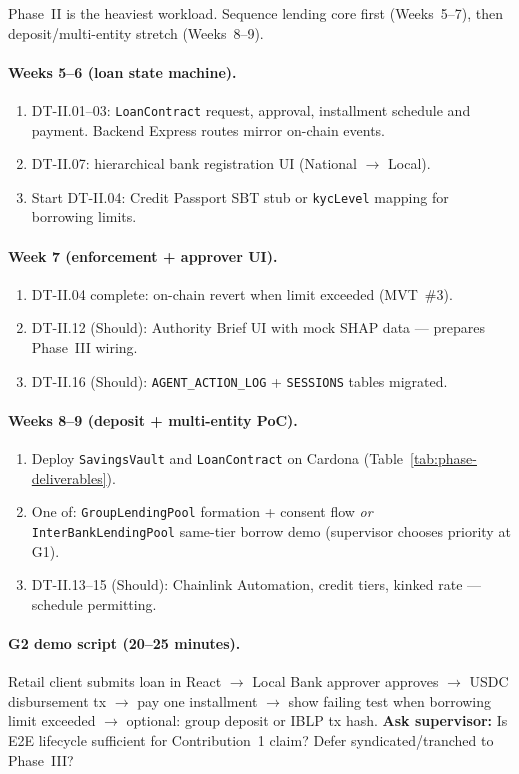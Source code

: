 \documentclass[12pt,a4paper]{report}
\begin{document}
Phase~II is the heaviest workload. Sequence lending core first (Weeks~5--7), then deposit/multi-entity stretch (Weeks~8--9).

\paragraph{Weeks 5--6 (loan state machine).}
\begin{enumerate}[noitemsep]
\item DT-II.01--03: \texttt{LoanContract} request, approval, installment schedule and payment. Backend Express routes mirror on-chain events.
\item DT-II.07: hierarchical bank registration UI (National $\to$ Local).
\item Start DT-II.04: Credit Passport SBT stub or \texttt{kycLevel} mapping for borrowing limits.
\end{enumerate}

\paragraph{Week 7 (enforcement + approver UI).}
\begin{enumerate}[noitemsep]
\item DT-II.04 complete: on-chain revert when limit exceeded (MVT~\#3).
\item DT-II.12 (Should): Authority Brief UI with mock SHAP data --- prepares Phase~III wiring.
\item DT-II.16 (Should): \texttt{AGENT\_ACTION\_LOG} + \texttt{SESSIONS} tables migrated.
\end{enumerate}

\paragraph{Weeks 8--9 (deposit + multi-entity PoC).}
\begin{enumerate}[noitemsep]
\item Deploy \texttt{SavingsVault} and \texttt{LoanContract} on Cardona (Table~\ref{tab:phase-deliverables}).
\item One of: \texttt{GroupLendingPool} formation + consent flow \emph{or} \texttt{InterBankLendingPool} same-tier borrow demo (supervisor chooses priority at G1).
\item DT-II.13--15 (Should): Chainlink Automation, credit tiers, kinked rate --- schedule permitting.
\end{enumerate}

\paragraph{G2 demo script (20--25 minutes).}
Retail client submits loan in React $\to$ Local Bank approver approves $\to$ USDC disbursement tx $\to$ pay one installment $\to$ show failing test when borrowing limit exceeded $\to$ optional: group deposit or IBLP tx hash. \textbf{Ask supervisor:} Is E2E lifecycle sufficient for Contribution~1 claim? Defer syndicated/tranched to Phase~III?
\end{document}
